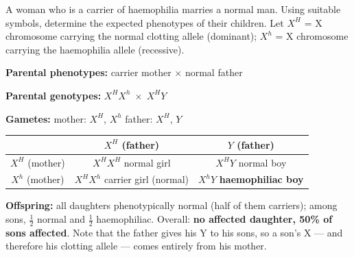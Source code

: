 \documentclass[11pt]{article}
\begin{document}
\begin{exoresolu}
A woman who is a carrier of haemophilia marries a normal man. Using suitable symbols, determine the expected phenotypes of their children.
\tcblower
Let $X^H$ = X chromosome carrying the normal clotting allele (dominant); $X^h$ = X chromosome carrying the haemophilia allele (recessive).

\textbf{Parental phenotypes:} carrier mother $\times$ normal father

\textbf{Parental genotypes:} $X^H X^h \;\times\; X^H Y$

\textbf{Gametes:} mother: $X^H$, $X^h$ \quad father: $X^H$, $Y$

\begin{center}
\begin{tabular}{|c|c|c|}
\hline
\rowcolor{popblueL} & $X^H$ (father) & $Y$ (father) \\
\hline
$X^H$ (mother) & $X^H X^H$ normal girl & $X^H Y$ normal boy \\
\hline
$X^h$ (mother) & $X^H X^h$ carrier girl (normal) & $X^h Y$ \textbf{haemophiliac boy} \\
\hline
\end{tabular}
\end{center}

\textbf{Offspring:} all daughters phenotypically normal (half of them carriers); among sons, $\tfrac{1}{2}$ normal and $\tfrac{1}{2}$ haemophiliac. Overall: \textbf{no affected daughter, 50\% of sons affected}. Note that the father gives his Y to his sons, so a son's X --- and therefore his clotting allele --- comes entirely from his mother.
\end{exoresolu}
\end{document}
